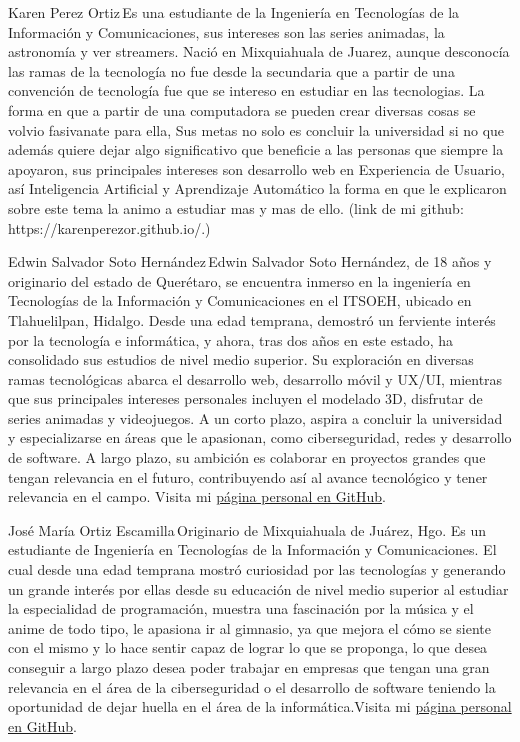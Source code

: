\documentclass{IEEEcsmag}
\begin{document}
\begin{IEEEbiography}{Karen Perez Ortiz}{\,}Es una estudiante de la Ingeniería en Tecnologías de la Información y Comunicaciones, sus intereses son las series animadas, la astronomía y ver streamers. Nació en Mixquiahuala de Juarez, aunque desconocía las ramas de la tecnología no fue desde la secundaria que a partir de una convención de tecnología fue que se intereso en estudiar en las tecnologias. La forma en que a partir de una computadora se pueden crear diversas cosas se volvio fasivanate para ella, Sus metas no solo es concluir la universidad si no que además quiere dejar algo significativo que beneficie a las personas que siempre la apoyaron, sus principales intereses son desarrollo web en Experiencia de Usuario, así Inteligencia Artificial y Aprendizaje Automático la forma en que le explicaron sobre este tema la animo a estudiar mas y mas de ello. (link de mi github: https://karenperezor.github.io/.)
\end{IEEEbiography}
\begin{IEEEbiography}{Edwin Salvador Soto Hernández}{\,}Edwin Salvador Soto Hernández, de 18 años y originario del estado de Querétaro, se encuentra inmerso en la ingeniería en Tecnologías de la Información y Comunicaciones en el ITSOEH, ubicado en Tlahuelilpan, Hidalgo. Desde una edad temprana, demostró un ferviente interés por la tecnología e informática, y ahora, tras dos años en este estado, ha consolidado sus estudios de nivel medio superior. Su exploración en diversas ramas tecnológicas abarca el desarrollo web, desarrollo móvil y UX/UI, mientras que sus principales intereses personales incluyen el modelado 3D, disfrutar de series animadas y videojuegos. A un corto plazo, aspira a concluir la universidad y especializarse en áreas que le apasionan, como ciberseguridad, redes y desarrollo de software. A largo plazo, su ambición es colaborar en proyectos grandes que tengan relevancia en el futuro, contribuyendo así al avance tecnológico y tener relevancia en el campo. Visita mi \href{https://edwinsotohz.github.io/}{página personal en GitHub}.
\end{IEEEbiography}
\begin{IEEEbiography}{José María Ortiz Escamilla}{\,}Originario de Mixquiahuala de Juárez, Hgo. Es un estudiante de Ingeniería en Tecnologías de la Información y Comunicaciones. El cual desde una edad temprana mostró curiosidad por las tecnologías y generando un grande interés por ellas desde su educación de nivel medio superior al estudiar la especialidad de programación, muestra una fascinación por la música y el anime de todo tipo, le apasiona ir al gimnasio, ya que mejora el cómo se siente con el mismo y lo hace sentir capaz de lograr lo que se proponga, lo que desea conseguir a largo plazo desea poder trabajar en empresas que tengan una gran relevancia en el área de la ciberseguridad o el desarrollo de software teniendo la oportunidad de dejar huella en el área de la informática.Visita mi \href{https://joseoe.github.io/}{página personal en GitHub}.
\end{IEEEbiography}
\end{document}
